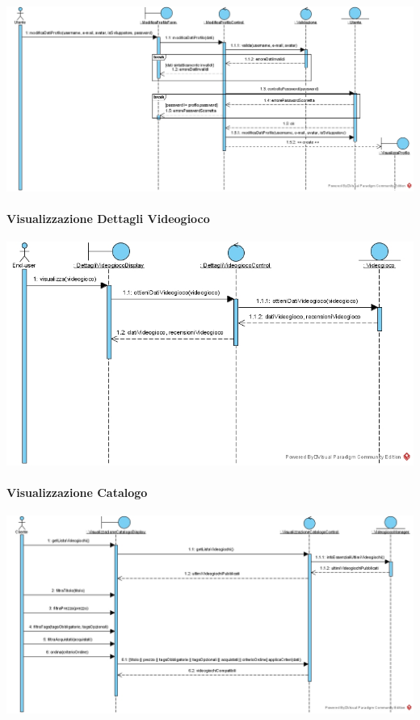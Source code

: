 \begin{center}
\includegraphics[width=\textwidth,height=\textheight,keepaspectratio]{Figure/SequenceDiagrams/ModificaProfiloInner.jpg}
\end{center}

\newpage
\paragraph{Visualizzazione Dettagli Videogioco}
\begin{center}
\includegraphics[width=\textwidth,height=\textheight,keepaspectratio]{Figure/SequenceDiagrams/VisualizzazioneDettagliVideogioco.jpg}
\end{center}

\paragraph{Visualizzazione Catalogo}
\begin{center}
\includegraphics[width=\textwidth,height=\textheight,keepaspectratio]{Figure/SequenceDiagrams/VisualizzazioneCatalogo.jpg}
\end{center}

